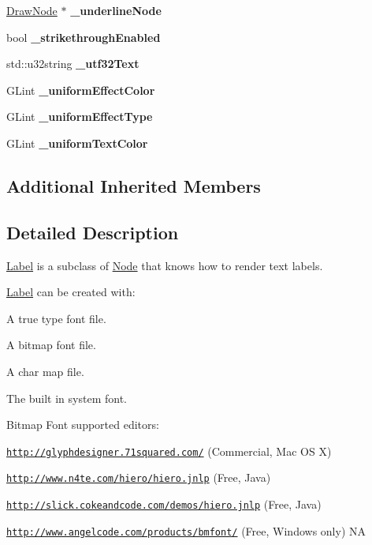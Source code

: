 \begin{DoxyCompactItemize}
\mbox{\label{classLabel_a14d14c738c082b0f64dbb6d202bbb385}} 
\hyperlink{classDrawNode}{Draw\+Node} $\ast$ {\bfseries \+\_\+underline\+Node}
\item 
\mbox{\label{classLabel_af3c806d37cf0cacd75cf8f2f191141e8}} 
bool {\bfseries \+\_\+strikethrough\+Enabled}
\item 
\mbox{\label{classLabel_a527afd286a7f9097f4e1247a9c94cc85}} 
std\+::u32string {\bfseries \+\_\+utf32\+Text}
\item 
\mbox{\label{classLabel_ace6a32a53e6d091ab7684542f9bfd1f8}} 
G\+Lint {\bfseries \+\_\+uniform\+Effect\+Color}
\item 
\mbox{\label{classLabel_aa312b5f1a3d0b215e8c3e82acd7d9ecd}} 
G\+Lint {\bfseries \+\_\+uniform\+Effect\+Type}
\item 
\mbox{\label{classLabel_af8a49539b0c1ed19c0f34c175e587dd0}} 
G\+Lint {\bfseries \+\_\+uniform\+Text\+Color}
\end{DoxyCompactItemize}
\subsection*{Additional Inherited Members}


\subsection{Detailed Description}
\hyperlink{classLabel}{Label} is a subclass of \hyperlink{classNode}{Node} that knows how to render text labels. 

\hyperlink{classLabel}{Label} can be created with\+:
\begin{DoxyItemize}
\item A true type font file.
\item A bitmap font file.
\item A char map file.
\item The built in system font.
\end{DoxyItemize}

Bitmap Font supported editors\+:
\begin{DoxyItemize}
\item \href{http://glyphdesigner.71squared.com/}{\tt http\+://glyphdesigner.\+71squared.\+com/} (Commercial, Mac OS X)
\item \href{http://www.n4te.com/hiero/hiero.jnlp}{\tt http\+://www.\+n4te.\+com/hiero/hiero.\+jnlp} (Free, Java)
\item \href{http://slick.cokeandcode.com/demos/hiero.jnlp}{\tt http\+://slick.\+cokeandcode.\+com/demos/hiero.\+jnlp} (Free, Java)
\item \href{http://www.angelcode.com/products/bmfont/}{\tt http\+://www.\+angelcode.\+com/products/bmfont/} (Free, Windows only)  NA 
\end{DoxyItemize}

